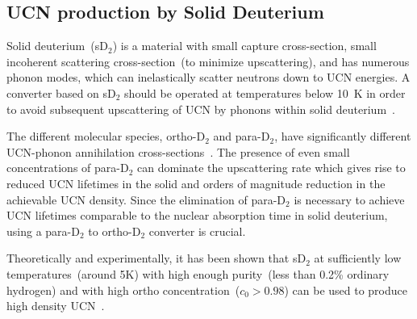 


\subsection{UCN production by Solid Deuterium}
Solid deuterium~(sD$_2$) is a material with small capture
cross-section, small incoherent scattering cross-section~(to minimize
upscattering), and has numerous phonon modes, which can inelastically
scatter neutrons down to UCN energies.  A converter based on sD$_2$
should be operated at temperatures below 10~K in order to avoid
subsequent upscattering of UCN by phonons within solid
deuterium~\cite{Frei2010}.

The different molecular species, ortho-D$_2$ and para-D$_2$, have
significantly different UCN-phonon annihilation
cross-sections~\cite{Liu2000, Morris2002}. The presence of even small
concentrations of para-D$_2$ can dominate the upscattering rate which
gives rise to reduced UCN lifetimes in the solid and orders of
magnitude reduction in the achievable UCN density.
Since the elimination of para-D$_2$ is necessary to achieve UCN
lifetimes comparable to the nuclear absorption time in solid
deuterium, using a para-D$_2$ to ortho-D$_2$ converter is crucial.


Theoretically and experimentally, it has been shown that sD$_2$ at
sufficiently low temperatures~(around 5K) with high enough
purity~(less than 0.2\% ordinary hydrogen) and with high ortho
concentration~($c_0 > 0.98$) can be used to produce high density
UCN~\cite{Atchison2005}.


